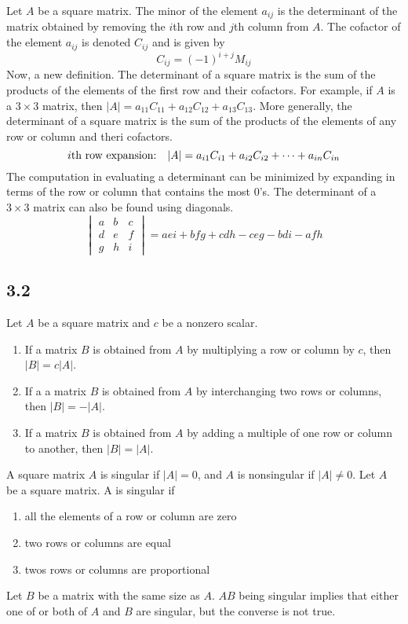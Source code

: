 \documentclass{article}
\begin{document}
    Let $A$ be a square matrix. The minor of the element $a_{ij}$ is the determinant of the matrix 
    obtained by removing the $i$th row and $j$th column from $A$.
    The cofactor of the element $a_{ij}$ is denoted $C_{ij}$ and is given by
    \[
    C_{ij} = (-1)^{i+j}M_{ij}
    \]
    Now, a new definition. 
    The determinant of a square matrix is the sum of the products of the elements of the first row
    and their cofactors. For example, if $A$ is a $3 \times 3$ matrix,
    then $|A| = a_{11}C_{11} + a_{12}C_{12} + a_{13}C_{13}.$
    More generally, the determinant of a square matrix is the sum of the products
    of the elements of any row or column and theri cofactors. 
    \[
    i\text{th row expansion:} \quad |A| = a_{i1}C_{i1} + a_{i2}C_{i2} + \dots + a_{in}C_{in} \\
    \]
    The computation in evaluating a determinant can be minimized 
    by expanding in terms of the row or column that contains the most 0's. 
    The determinant of a $3 \times 3$ matrix can also be found using diagonals. 
    \[
    \begin{vmatrix}
    a & b & c \\
    d & e & f \\
    g & h & i
    \end{vmatrix}
     = aei + bfg + cdh - ceg - bdi - afh
    \]

    \subsection*{3.2}
    Let $A$ be a square matrix and $c$ be a nonzero scalar.
    \begin{enumerate}
        \item If a matrix $B$ is obtained from $A$ by multiplying a row or column by $c$, then $|B| = c|A|$.
        \item If a a matrix $B$ is obtained from $A$ by interchanging two rows or columns, then $|B| = -|A|$.
        \item If a matrix $B$ is obtained from $A$ by adding a multiple of one row or column to another, then $|B| = |A|$.
    \end{enumerate}

    A square matrix $A$ is singular if $|A| = 0$, and $A$ is nonsingular if $|A| \neq 0$.
    Let $A$ be a square matrix. A is singular if 
    \begin{enumerate}
        \item all the elements of a row or column are zero
        \item two rows or columns are equal
        \item twos rows or columns are proportional
    \end{enumerate}
    Let $B$ be a matrix with the same size as $A$.
    $AB$ being singular implies that either one of or both of $A$ and $B$ are singular, 
    but the converse is not true.
\end{document}
